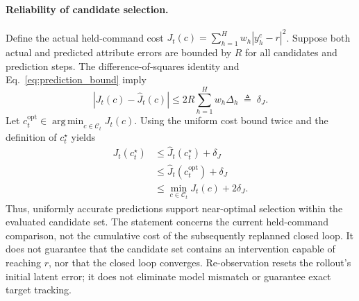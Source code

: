 \paragraph{Reliability of candidate selection.}

Define the actual held-command cost
$J_t(c)=\sum_{h=1}^{H}w_h|y_h^c-r|^2$.
Suppose both actual and predicted attribute errors are bounded by $R$
for all candidates and prediction steps. The difference-of-squares
identity and Eq.~\eqref{eq:prediction_bound} imply
\begin{equation}
    \left|
        J_t(c)-\widehat{J}_t(c)
    \right|
    \leq
    2R\sum_{h=1}^{H}w_h\Delta_h
    \;\triangleq\;\delta_J.
    \label{eq:cost_bound}
\end{equation}
Let
$c_t^{\mathrm{opt}}
\in\operatorname*{arg\,min}_{c\in\mathcal{C}_t}J_t(c)$.
Using the uniform cost bound twice and the definition of
$c_t^{\star}$ yields
\begin{equation}
    \begin{aligned}
        J_t(c_t^{\star})
        &\leq
        \widehat{J}_t(c_t^{\star})+\delta_J\\
        &\leq
        \widehat{J}_t(c_t^{\mathrm{opt}})+\delta_J\\
        &\leq
        \min_{c\in\mathcal{C}_t}J_t(c)+2\delta_J.
    \end{aligned}
    \label{eq:selection_bound}
\end{equation}
Thus, uniformly accurate predictions support near-optimal selection
within the evaluated candidate set. The statement concerns the current
held-command comparison, not the cumulative cost of the subsequently
replanned closed loop. It does not guarantee that the candidate set
contains an intervention capable of reaching $r$, nor that the closed
loop converges. Re-observation resets the rollout's initial latent
error; it does not eliminate model mismatch or guarantee exact
target tracking.